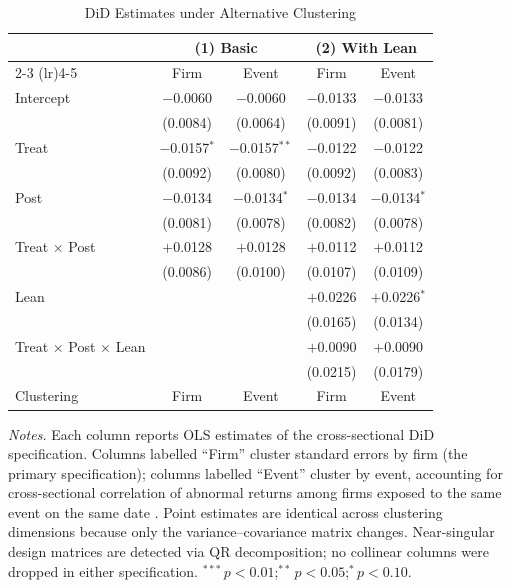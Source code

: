 \begin{table}[htbp]
\centering
\caption{DiD Estimates under Alternative Clustering}
\label{tab:cluster_robust}
\begin{tabular}{l cc cc}
\toprule
 & \multicolumn{2}{c}{(1) Basic} & \multicolumn{2}{c}{(2) With Lean} \\
\cmidrule(lr){2-3} \cmidrule(lr){4-5}
 & Firm & Event & Firm & Event \\
\midrule
Intercept & $-$0.0060 & $-$0.0060 & $-$0.0133 & $-$0.0133 \\
 & (0.0084) & (0.0064) & (0.0091) & (0.0081) \\[4pt]
Treat & $-$0.0157$^{*}$ & $-$0.0157$^{**}$ & $-$0.0122 & $-$0.0122 \\
 & (0.0092) & (0.0080) & (0.0092) & (0.0083) \\[4pt]
Post & $-$0.0134 & $-$0.0134$^{*}$ & $-$0.0134 & $-$0.0134$^{*}$ \\
 & (0.0081) & (0.0078) & (0.0082) & (0.0078) \\[4pt]
Treat $\times$ Post & $+$0.0128 & $+$0.0128 & $+$0.0112 & $+$0.0112 \\
 & (0.0086) & (0.0100) & (0.0107) & (0.0109) \\[4pt]
Lean & & & $+$0.0226 & $+$0.0226$^{*}$ \\
 & & & (0.0165) & (0.0134) \\[4pt]
Treat $\times$ Post $\times$ Lean & & & $+$0.0090 & $+$0.0090 \\
 & & & (0.0215) & (0.0179) \\
\midrule
Clustering & Firm & Event & Firm & Event \\
\bottomrule
\end{tabular}
\begin{tablenotes}[flushleft]\small
\item \textit{Notes.} Each column reports OLS estimates of the
cross-sectional DiD specification.  Columns labelled ``Firm'' cluster
standard errors by firm (the primary specification); columns labelled
``Event'' cluster by event, accounting for cross-sectional correlation
of abnormal returns among firms exposed to the same event on the same
date \citep{kolari2010}.  Point estimates are identical across clustering
dimensions because only the variance--covariance matrix changes.
Near-singular design matrices are detected via QR decomposition; no
collinear columns were dropped in either specification.
$^{***}\,p<0.01$;\enspace $^{**}\,p<0.05$;\enspace $^{*}\,p<0.10$.
\end{tablenotes}
\end{table}

